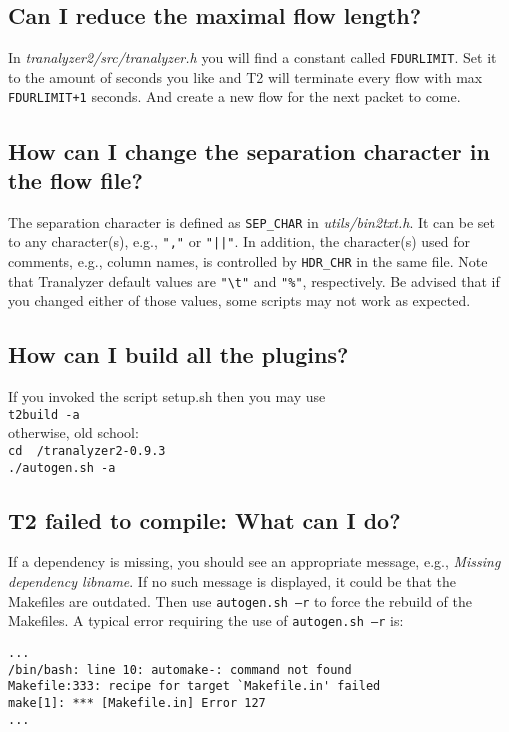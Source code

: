 \documentclass[documentation]{subfiles}
\begin{document}
\subsection{Can I reduce the maximal flow length?}
In {\em tranalyzer2/src/tranalyzer.h} you will find a constant called {\tt FDURLIMIT}.
Set it to the amount of seconds you like and T2 will terminate every flow with max {\tt FDURLIMIT+1} seconds.
And create a new flow for the next packet to come.

\subsection{How can I change the separation character in the flow file?}
The separation character is defined as {\tt SEP\_CHAR} in {\em utils/bin2txt.h}.
It can be set to any character(s), e.g., {\tt ","} or {\tt "||"}.
In addition, the character(s) used for comments, e.g., column names, is controlled by {\tt HDR\_CHR} in the same file.
Note that Tranalyzer default values are {\tt "\textbackslash{}t"} and {\tt "\%"}, respectively.
Be advised that if you changed either of those values, some scripts may not work as expected.

\subsection{How can I build all the plugins?}
If you invoked the script setup.sh then you may use\\
{\tt t2build -a} \\
otherwise, old school:\\

{\tt cd ~/tranalyzer2-0.9.3\\
     ./autogen.sh -a}

\subsection{T2 failed to compile: What can I do?}
If a dependency is missing, you should see an appropriate message, e.g., {\em Missing dependency libname}.
If no such message is displayed, it could be that the Makefiles are outdated.
Then use {\tt autogen.sh --r} to force the rebuild of the Makefiles.
A typical error requiring the use of {\tt autogen.sh --r} is:
\begin{verbatim}
...
/bin/bash: line 10: automake-: command not found
Makefile:333: recipe for target `Makefile.in' failed
make[1]: *** [Makefile.in] Error 127
...
\end{verbatim}
\end{document}
